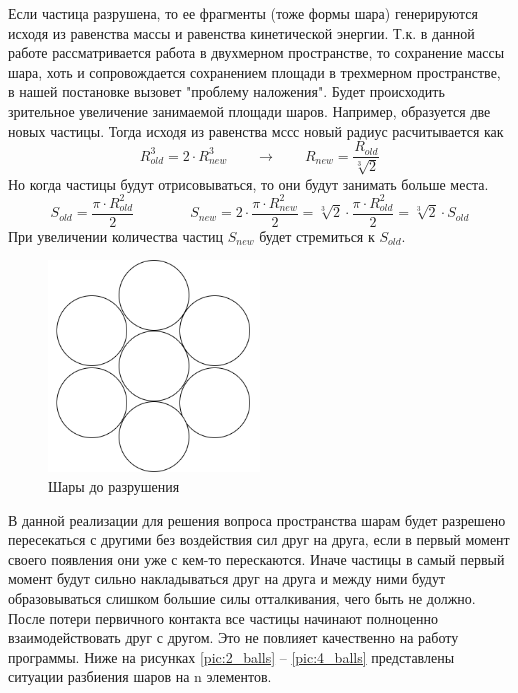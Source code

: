 \documentclass[utf8x, 14pt, oneside, a4paper]{article}
\begin{document}
Если частица разрушена, то ее фрагменты (тоже формы шара) генерируются исходя из равенства массы и равенства кинетической энергии. 
Т.к. в данной работе рассматривается работа в двухмерном пространстве, то сохранение массы шара, хоть и сопровождается сохранением площади в трехмерном пространстве, в нашей постановке вызовет "проблему наложения". 
Будет происходить зрительное увеличение занимаемой площади шаров.
Например, образуется две новых частицы.
Тогда исходя из равенства мссс новый радиус расчитывается как
\begin{equation*}
R_{old}^3 = 2 \cdot R^3_{new} \qquad \rightarrow \qquad R_{new} =\frac{R_{old}}{\sqrt[3]{2}}
\end{equation*}
Но когда частицы будут отрисовываться, то они будут занимать больше места.
\begin{equation*}
S_{old} = \frac{\pi \cdot R_{old}^2}{2} \qquad \qquad S_{new} = 2 \cdot \frac{\pi \cdot R_{new}^2}{2} = \sqrt[3]{2} \cdot \frac{\pi \cdot R_{old}^2}{2} = \sqrt[3]{2} \cdot S_{old}
\end{equation*}
При увеличении количества частиц $S_{new}$ будет стремиться к $S_{old}$.
\begin{figure}[H]
	\centering
	\includegraphics[width=0.5\textwidth]{1_balls} 
	\caption{Шары до разрушения}
	\label{pic:1_balls}
\end{figure} 
В данной реализации для решения вопроса пространства шарам будет разрешено пересекаться с другими без воздействия сил друг на друга, если в первый момент своего появления они уже с кем-то перескаются.
Иначе частицы в самый первый момент будут сильно накладываться друг на друга и между ними будут образовываться слишком большие силы отталкивания, чего быть не должно.
После потери первичного контакта все частицы начинают полноценно взаимодействовать друг с другом.
Это не повлияет качественно на работу программы.
Ниже на рисунках \ref{pic:2_balls} -- \ref{pic:4_balls} представлены ситуации разбиения шаров на n элементов.
\end{document}
